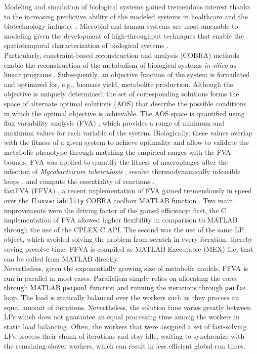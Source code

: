 \newpage
\noindent Modeling and simulation of biological systems gained tremendous interest thanks to the increasing predictive ability of the modeled systems in healthcare and the biotechnology industry \cite{gottstein2016constraint}. Microbial and human systems are most amenable to modeling given the development of high-throughput techniques that enable the spatiotemporal characterization of biological systems \cite{oyaas2017genome}.\\
Particularly, constraint-based reconstruction and analysis (COBRA) methods enable the reconstruction of the metabolism of biological systems \textit{in silico} as linear programs \cite{o2015using}. Subsequently, an objective function of the system is formulated and optimized for, e.g., biomass yield, metabolite production. Although the objective is uniquely determined, the set of corresponding solutions forms the space of alternate optimal solutions (AOS) that describe the possible conditions in which the optimal objective is achievable. The AOS space is quantified using flux variability analysis (FVA) \cite{mahadevan2003effects}, which provides a range of minimum and maximum values for each variable of the system. Biologically, these values overlap with the fitness of a given system to achieve optimality and allow to validate the metabolic phenotype through matching the empirical ranges with the FVA bounds. FVA was applied to quantify the fitness of macrophages after the infection of \textit{Mycobacteirum tuberculosis} \cite{bordbar2010insight}, resolve thermodynamically infeasible loops \cite{muller2013fast}, and compute the essentiality of reactions \cite{chen2009expanded}.\\
fastFVA (FFVA) \cite{gudmundsson2010computationally}, a recent implementation of FVA gained tremendously in speed over the \texttt{fluxvariability} COBRA toolbox MATLAB function \cite{heirendt2017creation}. Two main improvements were the driving factor of the gained efficiency: first, the C implementation of FVA allowed higher flexibility in comparison to MATLAB \cite{MATLAB:2014} through the use of the CPLEX C API. The second was the use of the same LP object, which avoided solving the problem from scratch in every iteration, thereby saving presolve time. FFVA is compiled as MATLAB Executable (MEX) file, that can be called from MATLAB directly.\\
Nevertheless, given the exponentially growing size of metabolic models, FFVA is run in parallel in most cases. Parallelism simply relies on allocating the cores through MATLAB \texttt{parpool} function \cite{MATLAB:2014} and running the iterations through \texttt{parfor} loop. The load is statically balanced over the workers such as they process an equal amount of iterations. Nevertheless, the solution time varies greatly between LPs which does not guarantee an equal processing time among the workers in static load balancing. Often, the workers that were assigned a set of fast-solving LPs process their chunk of iterations and stay idle, waiting to synchronize with the remaining slower workers, which can result in less efficient global run times.
